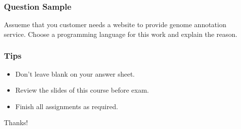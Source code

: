 \documentclass[UTF8]{beamer}
\begin{document}
\begin{frame}
  \frametitle{Question Sample}
  Assueme that you customer needs a website to provide genome annotation service. Choose a
  programming language for this work and explain the reason.
\end{frame}

\begin{frame}
  \frametitle{Tips}
  \begin{itemize}
    \item Don't leave blank on your answer sheet.
    \item Review the slides of this course before exam.
    \item Finish all assignments as required.
  \end{itemize}
\end{frame}

\begin{frame}
  \centerline{\Huge{Thanks!}}
\end{frame}
\end{document}

